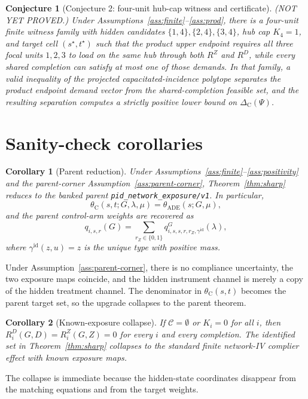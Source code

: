 \documentclass[11pt]{article}
\newcommand{\PsiObs}{\Psi}
\theoremstyle{definition}
\theoremstyle{plain}
\newtheorem{conjecture}{Conjecture}
\newtheorem{corollary}{Corollary}
\theoremstyle{remark}
\begin{document}
\begin{conjecture}[Conjecture 2: four-unit hub-cap witness and certificate]\label{conj:witness}
(NOT YET PROVED.) Under Assumptions~\ref{ass:finite}--\ref{ass:prod}, there is
a four-unit finite witness family with hidden candidates
\(\{1,4\},\{2,4\},\{3,4\}\), hub cap \(K_4=1\), and target cell
\((s^\star,t^\star)\) such that the product upper endpoint requires all three
focal units \(1,2,3\) to load on the same hub through both
\(R^Z\) and \(R^D\), while every shared completion can satisfy at most one of
those demands. In that family, a valid inequality of the projected
capacitated-incidence polytope separates the product endpoint demand vector
from the shared-completion feasible set, and the resulting separation computes a
strictly positive lower bound on \(\Delta_{\mathrm{C}}(\PsiObs)\).
\end{conjecture}

\section{Sanity-check corollaries}
\begin{corollary}[Parent reduction]\label{cor:parent}
Under Assumptions~\ref{ass:finite}--\ref{ass:positivity} and the parent-corner
Assumption~\ref{ass:parent-corner}, Theorem~\ref{thm:sharp} reduces to the
banked parent \texttt{pid\_network\_exposure/v1}. In particular,
\[
\theta_{\mathrm{C}}(s,t;G,\lambda,\mu)
=
\theta_{\mathrm{ADE}}(s;G,\mu),
\]
and the parent control-arm weights are recovered as
\[
q_{i,s,r}(G)
=
\sum_{r_Z\in\{0,1\}}
q^G_{i,s,s,r,r_Z,\gamma^{\mathrm{id}}}(\lambda),
\]
where \(\gamma^{\mathrm{id}}(z,u)=z\) is the unique type with positive mass.
\end{corollary}
Under Assumption~\ref{ass:parent-corner}, there is no compliance uncertainty,
the two exposure maps coincide, and the hidden instrument channel is merely a
copy of the hidden treatment channel. The denominator in
\(\theta_{\mathrm{C}}(s,t)\) becomes the parent target set, so the upgrade
collapses to the parent theorem.

\begin{corollary}[Known-exposure collapse]\label{cor:known}
If \(\mathcal C=\emptyset\) or \(K_i=0\) for all \(i\), then
\(R_i^D(G,D)=R_i^Z(G,Z)=0\) for every \(i\) and every completion. The
identified set in Theorem~\ref{thm:sharp} collapses to the standard finite
network-IV complier effect with known exposure maps.
\end{corollary}
The collapse is immediate because the hidden-state coordinates disappear from
the matching equations and from the target weights.
\end{document}
